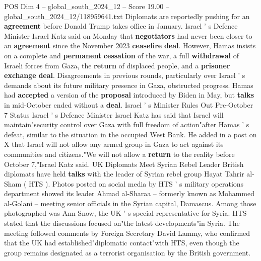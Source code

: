 \begin{textsample}{POS Dim 4 – global\_south\_2024\_12 – Score 19.00 – global\_south\_2024\_12/118959641.txt}
Diplomats are reportedly pushing for an \textbf{agreement} before Donald Trump takes office in January.
Israel ' s Defence Minister Israel Katz said on Monday that \textbf{negotiators} had never been closer to an \textbf{agreement} since the November 2023 \textbf{ceasefire} \textbf{deal}.
However, Hamas insists on a complete and \textbf{permanent} \textbf{cessation} of the war, a full \textbf{withdrawal} of Israeli forces from Gaza, the \textbf{return} of displaced people, and a \textbf{prisoner} \textbf{exchange} \textbf{deal}.
Disagreements in previous rounds, particularly over Israel ' s demands about its future military presence in Gaza, obstructed progress.
Hamas had \textbf{accepted} a version of the \textbf{proposal} introduced by Biden in May, but \textbf{talks} in mid-October ended without a \textbf{deal}.
Israel ' s Minister Rules Out Pre-October 7 Status Israel ' s Defence Minister Israel Katz has said that Israel will maintain"security control over Gaza with full freedom of action"after Hamas ' s defeat, similar to the situation in the occupied West Bank.
He added in a post on X that Israel will not allow any armed group in Gaza to act against its communities and citizens."We will not allow a \textbf{return} to the reality before October 7,"Israel Katz said.
UK Diplomats Meet Syrian Rebel Leader British diplomats have held \textbf{talks} with the leader of Syrian rebel group Hayat Tahrir al-Sham ( HTS ).
Photos posted on social media by HTS ' s military operations department showed its leader Ahmad al-Sharaa -- formerly known as Mohammed al-Golani -- meeting senior officials in the Syrian capital, Damascus.
Among those photographed was Ann Snow, the UK ' s special representative for Syria.
HTS stated that the discussions focused on"the latest developments"in Syria.
The meeting followed comments by Foreign Secretary David Lammy, who confirmed that the UK had established"diplomatic contact"with HTS, even though the group remains designated as a terrorist organisation by the British government.

\end{textsample}
